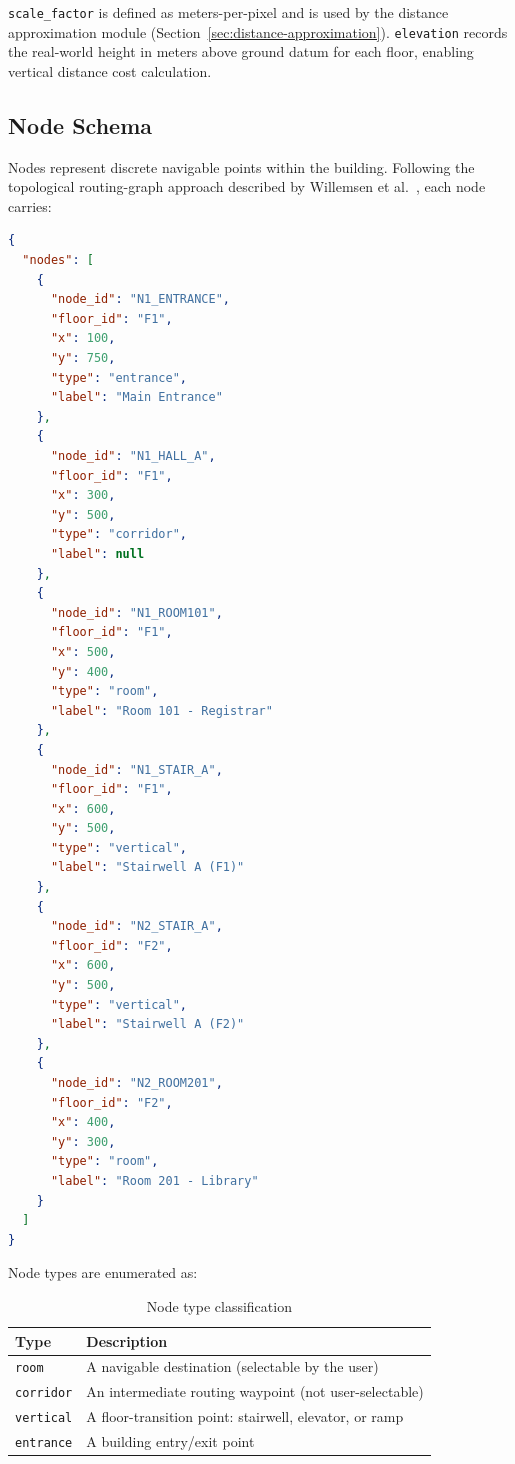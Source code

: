 \texttt{scale\_factor} is defined as meters-per-pixel and is used by the distance approximation module (Section~\ref{sec:distance-approximation}). \texttt{elevation} records the real-world height in meters above ground datum for each floor, enabling vertical distance cost calculation.

\subsection{Node Schema}

Nodes represent discrete navigable points within the building. Following the topological routing-graph approach described by Willemsen et al.\ \cite{Willemsen2015}, each node carries:

\begin{lstlisting}[language=json, caption={Node data structure}]
{
  "nodes": [
    {
      "node_id": "N1_ENTRANCE",
      "floor_id": "F1",
      "x": 100,
      "y": 750,
      "type": "entrance",
      "label": "Main Entrance"
    },
    {
      "node_id": "N1_HALL_A",
      "floor_id": "F1",
      "x": 300,
      "y": 500,
      "type": "corridor",
      "label": null
    },
    {
      "node_id": "N1_ROOM101",
      "floor_id": "F1",
      "x": 500,
      "y": 400,
      "type": "room",
      "label": "Room 101 - Registrar"
    },
    {
      "node_id": "N1_STAIR_A",
      "floor_id": "F1",
      "x": 600,
      "y": 500,
      "type": "vertical",
      "label": "Stairwell A (F1)"
    },
    {
      "node_id": "N2_STAIR_A",
      "floor_id": "F2",
      "x": 600,
      "y": 500,
      "type": "vertical",
      "label": "Stairwell A (F2)"
    },
    {
      "node_id": "N2_ROOM201",
      "floor_id": "F2",
      "x": 400,
      "y": 300,
      "type": "room",
      "label": "Room 201 - Library"
    }
  ]
}
\end{lstlisting}

Node types are enumerated as:

\begin{table}[H]
\centering
\caption{Node type classification}
\begin{tabularx}{0.85\textwidth}{lX}
\toprule
\textbf{Type} & \textbf{Description} \\
\midrule
\texttt{room} & A navigable destination (selectable by the user) \\
\texttt{corridor} & An intermediate routing waypoint (not user-selectable) \\
\texttt{vertical} & A floor-transition point: stairwell, elevator, or ramp \\
\texttt{entrance} & A building entry/exit point \\
\bottomrule
\end{tabularx}
\end{table}


